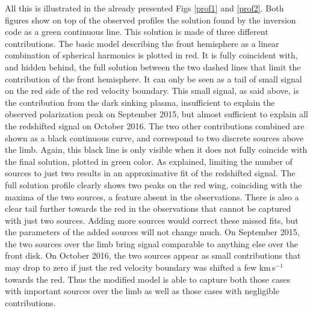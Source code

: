 \documentclass{/Users/art2/TeX/aanda/aa}
\def\kms {km\,s$^{-1}$}
\begin{document}
All this is illustrated in the already presented Figs \ref{prof1} and \ref{prof2}. Both figures show on top of the observed profiles the solution found by the inversion code as a green continuous line. This solution is made of three different contributions. The basic model describing the front hemisphere as a linear combination of spherical harmonics is plotted in red. It is fully coincident with, and hidden behind,  the full solution between the two dashed lines that limit the contribution of the front hemisphere. It can only be seen as a tail of small signal on the red side of the red velocity boundary. This small signal, as said above, is the contribution from the dark sinking plasma, insufficient to explain the observed polarization peak on September 2015, but almost sufficient to explain all the redshifted signal on October 2016. The two other contributions combined are shown as a black continuous curve, and correspond to two discrete sources above the limb. Again, this black line is only visible when it does not fully coincide with the final solution, plotted in green color.
As explained, limiting the number of sources to just two results in an approximative fit of the redshifted signal. The full solution profile clearly shows two peaks on the red wing, coinciding with the maxima of the two sources, a feature absent in the observations. There is also a clear tail further towards the red in the observations that cannot be captured with just two sources. Adding more sources would correct these missed fits, but the parameters of the added sources will not change much. On September 2015, the two sources over the limb bring signal comparable to anything else over the front disk. On October 2016, the two sources appear as small contributions that may drop to zero if just the red velocity boundary was shifted a few \kms towards the red. Thus the modified model is able to capture both those cases with important sources over the limb as well as those cases with negligible contributions.
\end{document}
